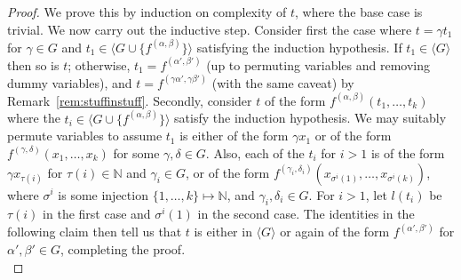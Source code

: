 \documentclass[10pt,a4paper]{amsart}
\begin{document}
\begin{proof} We prove this by induction on complexity of $t$, where the base case is trivial. We now carry out the inductive step.
{Consider first the case where $t=\gamma t_1$ for $\gamma\in G$ and $t_1\in\langle G \cup \{f^{(\alpha, \beta)}\}\rangle$ satisfying the induction hypothesis. If $t_1\in\langle G\rangle$ then so is $t$; otherwise,  $t_1=f^{(\alpha',\beta')}$ (up to permuting variables and removing dummy variables), and $t=f^{(\gamma \alpha',\gamma\beta')}$ (with the same caveat) by Remark~\ref{rem:stuffinstuff}.}
{Secondly, consider $t$ of the form}
$f^{(\alpha, \beta)}(t_1, \dots, t_k)$ where the $t_i\in\langle G \cup \{f^{(\alpha, \beta)}\}\rangle$ {satisfy the induction hypothesis.} %
We may suitably permute variables to {assume $t_1$} is %
either of the form %
$\gamma x_1$ or of the form $f^{(\gamma, \delta)}(x_1, \dots, x_k)$ for some $\gamma, \delta\in G$. Also, %
 each of the $t_i$ for $i>1$ is of the form $\gamma x_{\tau(i)}$ for $\tau(i)\in\mathbb{N}$ and $\gamma_i\in G$, or of the form $f^{(\gamma_i, \delta_i)}(x_{\sigma^i(1)}, \dots, x_{\sigma^i(k)})$, where $\sigma^i$ is some injection $\{1, \dots, k\}\mapsto\mathbb{N}$, and $\gamma_i, \delta_i\in G$. For $i>1$, let $l(t_i)$ be $\tau(i)$ in the first case and $\sigma^i(1)$ in the second case. The identities in the following claim then tell us that {$t$} is either in $\langle G\rangle$ or again of the form $f^{(\alpha', \beta')}$ for $\alpha', \beta'\in G$, completing the proof.\\


\end{proof}
\end{document}
